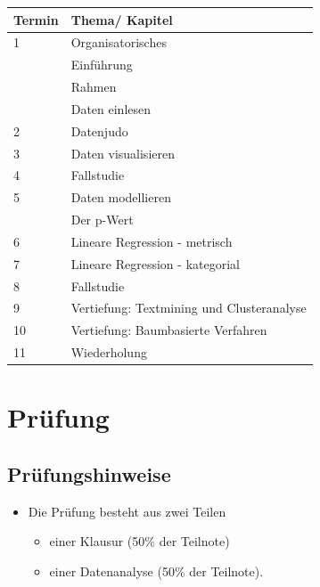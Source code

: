 \documentclass[12pt,ngerman,]{book}
\providecommand{\tightlist}{%
  \setlength{\itemsep}{0pt}\setlength{\parskip}{0pt}}
\begin{document}
\begin{longtable}[]{@{}ll@{}}
\toprule
Termin & Thema/ Kapitel\tabularnewline
\midrule
\endhead
1 & Organisatorisches\tabularnewline
\begin{minipage}[t]{0.48\columnwidth}\raggedright\strut
\strut
\end{minipage} & \begin{minipage}[t]{0.48\columnwidth}\raggedright\strut
Einführung\strut
\end{minipage}\tabularnewline
\begin{minipage}[t]{0.48\columnwidth}\raggedright\strut
\strut
\end{minipage} & \begin{minipage}[t]{0.48\columnwidth}\raggedright\strut
Rahmen\strut
\end{minipage}\tabularnewline
\begin{minipage}[t]{0.48\columnwidth}\raggedright\strut
\strut
\end{minipage} & \begin{minipage}[t]{0.48\columnwidth}\raggedright\strut
Daten einlesen\strut
\end{minipage}\tabularnewline
2 & Datenjudo\tabularnewline
3 & Daten visualisieren\tabularnewline
4 & Fallstudie\tabularnewline
5 & Daten modellieren\tabularnewline
\begin{minipage}[t]{0.48\columnwidth}\raggedright\strut
\strut
\end{minipage} & \begin{minipage}[t]{0.48\columnwidth}\raggedright\strut
Der p-Wert\strut
\end{minipage}\tabularnewline
6 & Lineare Regression - metrisch\tabularnewline
7 & Lineare Regression - kategorial\tabularnewline
8 & Fallstudie\tabularnewline
9 & Vertiefung: Textmining und Clusteranalyse\tabularnewline
10 & Vertiefung: Baumbasierte Verfahren\tabularnewline
11 & Wiederholung\tabularnewline
\bottomrule
\end{longtable}

\section{Prüfung}\label{prufung}

\subsection{Prüfungshinweise}\label{prufungshinweise}

\begin{itemize}
\tightlist
\item
  Die Prüfung besteht aus zwei Teilen

  \begin{itemize}
  \tightlist
  \item
    einer Klausur (50\% der Teilnote)
  \item
    einer Datenanalyse (50\% der Teilnote).
  \end{itemize}
\end{itemize}
\end{document}
